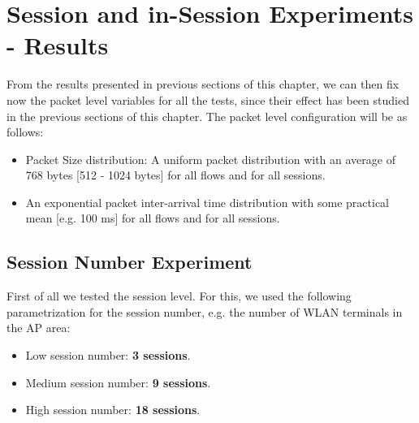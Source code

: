 \section{Session and in-Session Experiments - Results} \label{sec:final-results}
From the results presented in previous sections of this chapter, we can then fix now the packet level variables for all the tests, since their effect has been studied in the previous sections of this chapter. The packet level configuration will be as follows:

\begin{itemize}
\item Packet Size distribution: A uniform packet distribution with an average of 768 bytes [512 - 1024 bytes] for all flows and for all sessions.
\item An exponential packet inter-arrival time distribution with some practical mean [e.g. 100 ms] for all flows and for all sessions.
\end{itemize}

\subsection{Session Number Experiment} \label{sec:gv_session_exp}
First of all we tested the session level. For this, we used the following parametrization for the session number, e.g. the number of \acs{WLAN} terminals in the \acs{AP} area:

\begin{itemize}
	\item Low session number: \textbf{3 sessions}.
	\item Medium session number: \textbf{9 sessions}.
	\item High session number: \textbf{18 sessions}.
\end{itemize}

